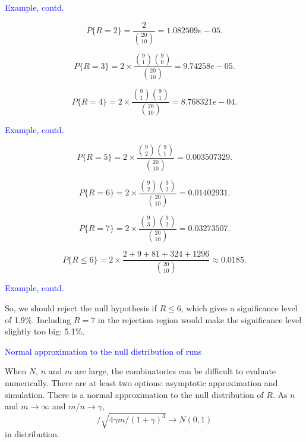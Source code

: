 \documentclass[landscape]{slides}
\newcommand{\beq}{\begin{equation}}
\newcommand{\eeq}{\end{equation}}
\begin{document}
\begin{slide}
{\textcolor{blue}{Example, contd.}}

\beq
    P\{R = 2\} = \frac{2}{{{20}\choose{10}}}
     =  1.082509e-05.
\eeq

\beq
    P\{R = 3\} = 2\times \frac{{{9} \choose{1}} {{9}\choose{0}}}{{{20}\choose{10}}}           
      = 9.74258e-05.
\eeq

\beq
    P\{R = 4\} = 2\times \frac{{{9}\choose {1}} {{9}\choose{1}}}{{{20}\choose{10}}}            
     = 8.768321e-04.
\eeq

\end{slide}

\begin{slide}
{\textcolor{blue}{Example, contd.}}

\beq
    P\{R = 5\} = 2\times \frac{{{9}\choose{2}} {{9}\choose{1}}}{{{20}\choose{10}}}            
     =  0.003507329.
\eeq

\beq
    P\{R = 6\} = 2\times \frac{{{9}\choose {2}} {{9}\choose {2}}}{{{20}\choose{10}}} 
     =  0.01402931.
\eeq

\beq
    P\{R = 7\} = 2\times \frac{{{9}\choose{3}}{{9}\choose{2}}}{{{20}\choose{10}}} 
     =  0.03273507.
\eeq

\beq
   P\{R \le 6\} = 2\times \frac{2+9+81+324+1296}{{{20}\choose{10}}} \approx 0.0185.
\eeq

\end{slide}

\begin{slide}
{\textcolor{blue}{Example, contd.}}

    So, we should reject the null hypothesis if $R \le 6$, which gives a
    significance level of 1.9\%.
    Including $R = 7$ in the rejection region would make the significance level slightly too big:
    5.1\%.

\end{slide}

\begin{slide}
{\textcolor{blue}{Normal approximation to the null distribution of runs}}

    When $N$, $n$ and $m$ are large, the combinatorics can be
    difficult to evaluate numerically.
    There are at least two options: asymptotic approximation and simulation.
    There is a normal approximation to the null distribution of $R$.
    As $n$ and $m \rightarrow \infty$ and $m/n \rightarrow \gamma$,
\beq
    [R - 2m/(1+ \gamma)]/\sqrt{4 \gamma m/(1+ \gamma )^3}
    \rightarrow N(0, 1)
\eeq
    in distribution.

\end{slide}
\end{document}
